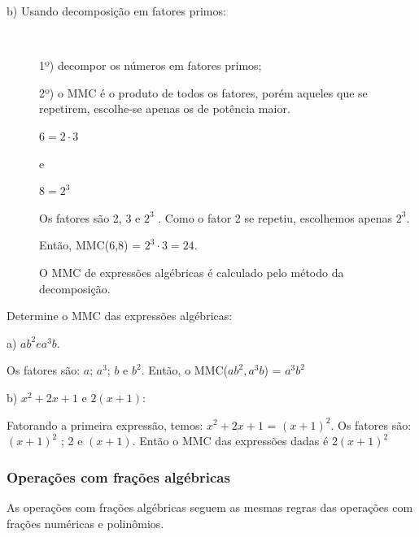 \begin{description}
    \item [b) Usando decomposição em fatores primos:]~
    
    1º) decompor os números em fatores primos;

    2º) o MMC é o produto de todos os fatores, porém aqueles que se repetirem, escolhe-se apenas os de potência maior. 
    
    \begin{multicols}{3}
    $6 = 2 \cdot 3$
    
    e
    
    $8 = 2^3$
    \end{multicols}
    
    Os fatores são 2, 3 e $2^3$ . Como o fator 2 se repetiu, escolhemos apenas $2^3$. 
    
    Então, MMC(6,8) =  $2^3 \cdot 3  = 24$.
 
	O MMC de expressões algébricas é calculado pelo método da decomposição.
\end{description}

\begin{description}
\item [Exemplo \thesubsection.\theexemplo] Determine o MMC das expressões algébricas:

a) $ab^2 e a^3b$.

Os fatores são: $a$; $a^3$; $b$ e $b^2$. Então, o MMC($ab^2, a^3b$) = $a^3b^2$

b) $x^2+2x+1$ e $2(x+1)$:

Fatorando a primeira expressão, temos: $x^2+2x+1$ = $(x + 1)^2$. 
Os fatores são: $(x + 1)^2$ ; 2 e $(x+1)$. Então o MMC das expressões dadas é $2(x + 1)^2$ \qedsymbol{}

\end{description}

\subsubsection{Operações com frações algébricas}

As operações com frações algébricas seguem as mesmas regras das operações com frações numéricas e polinômios.

